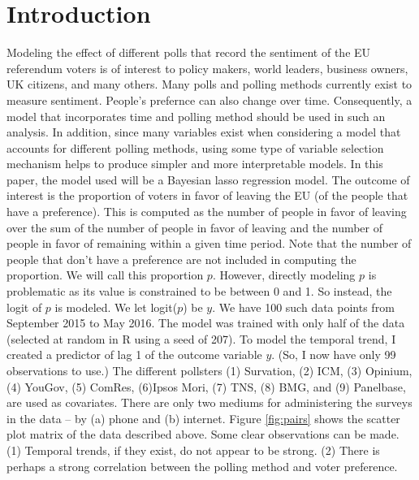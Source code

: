 \documentclass{../../tex_template/asaproc}
\begin{document}
\section{Introduction}
Modeling the effect of different polls that record the sentiment of the EU
referendum voters is of interest to policy makers, world leaders, business
owners, UK citizens, and many others. Many polls and polling methods currently
exist to measure sentiment. People's prefernce can also change over time.
Consequently, a model that incorporates time and polling method should be used
in such an analysis. In addition, since many variables exist when considering a
model that accounts for different polling methods, using some type of variable
selection mechanism helps to produce simpler and more interpretable models.
In this paper, the model used will be a Bayesian lasso regression model.
The outcome of interest is the proportion of voters in favor of leaving the
EU (of the people that have a preference). This is computed as the number
of people in favor of leaving over the sum of the number of people
in favor of leaving and the number of people in favor of remaining within
a given time period. Note that the number of people that don't have a preference
are not included in computing the proportion. We will call this proportion 
$p$. However, directly modeling $p$ is problematic as its value is constrained
to be between 0 and 1. So instead, the logit of $p$ is modeled. We let logit($p$)
be $y$. We have 100 such data points from September 2015 to May 2016. The model
was trained with only half of the data (selected at random in R using a seed of 207).
To model the temporal trend, I created a predictor of lag 1 of the outcome
variable $y$. (So, I now have only 99 observations to use.) The different 
pollsters (1) Survation, (2) ICM, (3) Opinium, (4) YouGov, (5) ComRes, (6)Ipsos Mori,
(7) TNS, (8) BMG, and (9) Panelbase, are used as covariates. There are
only two mediums for administering the surveys in the data -- by (a) phone
and (b) internet. Figure \ref{fig:pairs} shows the scatter plot matrix of
the data described above. Some clear observations can be made. (1) Temporal 
trends, if they exist, do not appear to be strong. (2) There is perhaps 
a strong correlation between the polling method and voter preference.
\end{document}
